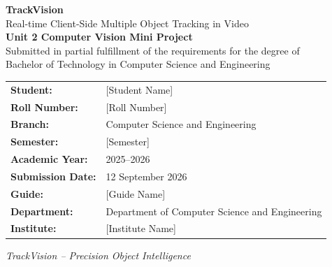 
\begin{titlepage}
    \centering
    \vspace*{2cm}
    
    {\Huge \bfseries \color{trackvisiondark} TrackVision}\\[0.5cm]
    {\LARGE \color{trackvisionblue} Real-time Client-Side Multiple Object Tracking in Video}\\[2cm]
    
    {\large \bfseries Unit 2 Computer Vision Mini Project}\\[1cm]
    
    {\large Submitted in partial fulfillment of the requirements for the degree of}\\[0.5cm]
    {\large Bachelor of Technology in Computer Science and Engineering}\\[2cm]
    
    \begin{tabular}{ll}
        \bfseries Student: & [Student Name] \\
        \bfseries Roll Number: & [Roll Number] \\
        \bfseries Branch: & Computer Science and Engineering \\
        \bfseries Semester: & [Semester] \\
        \bfseries Academic Year: & 2025--2026 \\
        \bfseries Submission Date: & 12 September 2026 \\
        \bfseries Guide: & [Guide Name] \\
        \bfseries Department: & Department of Computer Science and Engineering \\
        \bfseries Institute: & [Institute Name] \\
    \end{tabular}
    
    \vfill
    
    {\color{trackvisiongray} \textit{TrackVision -- Precision Object Intelligence}}
    
    \vspace{1cm}
\end{titlepage}

